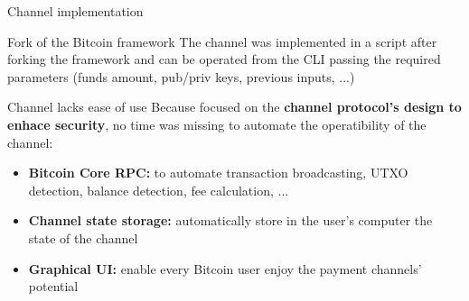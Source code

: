 \documentclass{beamer}
\begin{document}
\begin{frame}{Channel implementation}
 \begin{block}{Fork of the Bitcoin framework}
  The channel was implemented in a script after forking the framework and can be operated from the CLI passing the required parameters (funds amount, pub/priv keys, previous inputs, ...)
 \end{block}
 \begin{alertblock}{Channel lacks ease of use}
  Because focused on the \textbf{channel protocol's design to enhace security}, no time was missing to automate the operatibility of the channel:
  \begin{itemize}
   \item \textbf{Bitcoin Core RPC:} to automate transaction broadcasting, UTXO detection, balance detection, fee calculation, ...
   \item \textbf{Channel state storage:} automatically store in the user's computer the state of the channel
   \item \textbf{Graphical UI:} enable every Bitcoin user enjoy the payment channels' potential
  \end{itemize}
 \end{alertblock}
\end{frame}
\end{document}
